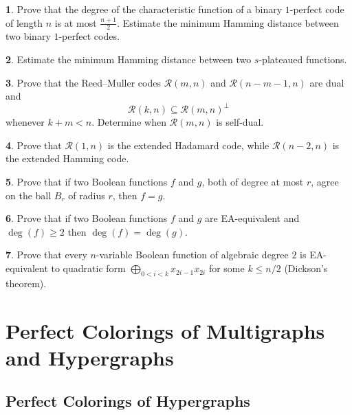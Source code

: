 \documentclass[11pt]{article}
\theoremstyle{definition}
\newtheorem{exercise}{\quad}
\begin{document}
{{{\begin{exercise}
Prove that the degree of the characteristic function of a binary
$1$-perfect code of length $n$ is at most
$\frac{n+1}{2}$.
Estimate the minimum Hamming distance between two binary $1$-perfect
codes.
\end{exercise}

\begin{exercise}
Estimate the minimum Hamming distance between two $s$-plateaued functions.
\end{exercise}

\begin{exercise}
Prove that the Reed--Muller codes $\mathcal{R}(m,n)$ and
$\mathcal{R}(n-m-1,n)$ are dual and
\[
\mathcal{R}(k,n)\subseteq\mathcal{R}(m,n)^\perp
\]
whenever $k+m<n$. Determine when
$\mathcal{R}(m,n)$ is self-dual.
\end{exercise}

\begin{exercise}
Prove that $\mathcal{R}(1,n)$ is the extended Hadamard code, while
$\mathcal{R}(n-2,n)$ is the extended Hamming code.
\end{exercise}

\begin{exercise}
Prove that if two Boolean functions $f$ and $g$, both of degree at most
$r$, agree on the ball $B_r$ of radius $r$, then $f=g$.
\end{exercise}


\begin{exercise}
Prove that if two Boolean functions $f$ and $g$ are EA-equivalent  and $\deg(f)\geq 2$ then $\deg(f)=\deg(g)$.
\end{exercise}

\begin{exercise}
 Prove that   every $n$-variable Boolean function of algebraic degree $2$ is EA-equivalent to quadratic  form $\bigoplus\limits_{0<i<k}x_{2i-1}x_{2i}$ for some $k\leq n/2$ (Dickson's theorem).
\end{exercise}


\section{Perfect Colorings of Multigraphs and Hypergraphs}

\subsection{Perfect Colorings of Hypergraphs}\label{hyp}

}}}
\end{document}
